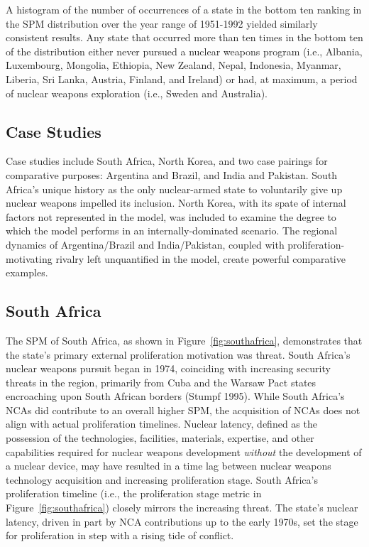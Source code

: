 \documentclass{article} %
\begin{document}
{A histogram of the number of occurrences of a state in the bottom ten ranking in the SPM distribution over the year range of 1951-1992 yielded similarly consistent results. Any state that occurred more than ten times in the bottom ten of the distribution either never pursued a nuclear weapons program (i.e., Albania, Luxembourg, Mongolia, Ethiopia, New Zealand, Nepal, Indonesia, Myanmar, Liberia, Sri Lanka, Austria, Finland, and Ireland) or had, at maximum, a period of nuclear weapons exploration (i.e., Sweden and Australia).   

\subsection{Case Studies}

Case studies include South Africa, North Korea, and two case pairings for comparative purposes: Argentina and Brazil, and India and Pakistan. South Africa's unique history as the only nuclear-armed state to voluntarily give up nuclear weapons impelled its inclusion. North Korea, with its spate of internal factors not represented in the model, was included to examine the degree to which the model performs in an internally-dominated scenario. The regional dynamics of Argentina/Brazil and India/Pakistan, coupled with proliferation-motivating rivalry left unquantified in the model, create powerful comparative examples. 

\subsection*{South Africa}

The SPM of South Africa, as shown in Figure~\ref{fig:southafrica}, demonstrates that the state's primary external proliferation motivation was threat. South Africa's nuclear weapons pursuit began in 1974, coinciding with increasing security threats in the region, primarily from Cuba and the Warsaw Pact states encroaching upon South African borders (Stumpf 1995). While South Africa's NCAs did contribute to an overall higher SPM, the acquisition of NCAs does not align with actual proliferation timelines. Nuclear latency, defined as the possession of the technologies, facilities, materials, expertise, and other capabilities required for nuclear weapons development \textit{without} the development of a nuclear device, may have resulted in a time lag between nuclear weapons technology acquisition and increasing proliferation stage. South Africa's proliferation timeline (i.e., the proliferation stage metric in Figure~\ref{fig:southafrica}) closely mirrors the increasing threat. The state's nuclear latency, driven in part by NCA contributions up to the early 1970s, set the stage for proliferation in step with a rising tide of conflict.  

}
\end{document}
